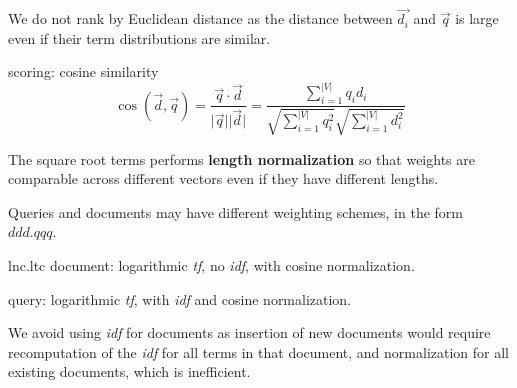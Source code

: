 We do not rank by Euclidean distance as the distance between $\overrightarrow{d_i}$ and $\overrightarrow{q}$ is large even if their term distributions are similar.

\begin{defn}{scoring: cosine similarity}
    \[
        \cos(\overrightarrow{d}, \overrightarrow{q})
        = \frac{\overrightarrow{q} \cdot \overrightarrow{d}}{\lvert \overrightarrow{q} \rvert \lvert \overrightarrow{d} \rvert}
        = \frac{\sum_{i=1}^{|V|}q_i d_i}{\sqrt{\sum_{i=1}^{|V|} q_i^2} \sqrt{\sum_{i=1}^{|V|} d_i^2}}
    \]

    The square root terms performs \textbf{length normalization} so that weights are comparable across different vectors even if they have different lengths.
\end{defn}

Queries and documents may have different weighting schemes, in the form $ddd.qqq$.

\begin{defn}{lnc.ltc}
    document: logarithmic \textit{tf}, no \textit{idf}, with cosine normalization.

    query: logarithmic \textit{tf}, with \textit{idf} and cosine normalization.

    We avoid using \textit{idf} for documents as insertion of new documents would require recomputation of the \textit{idf} for all terms in that document, and normalization for all existing documents, which is inefficient.
\end{defn}